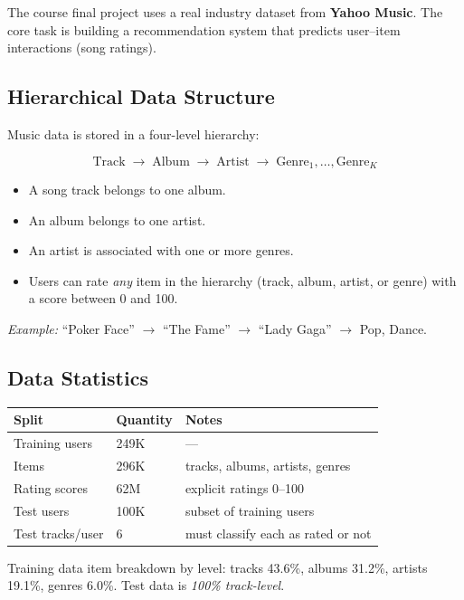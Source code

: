 \documentclass[11pt]{article}
\begin{document}
The course final project uses a real industry dataset from \textbf{Yahoo
Music}. The core task is building a recommendation system that predicts
user--item interactions (song ratings).

\subsection{Hierarchical Data Structure}
Music data is stored in a four-level hierarchy:

\[
\text{Track} \;\longrightarrow\; \text{Album} \;\longrightarrow\;
\text{Artist} \;\longrightarrow\; \text{Genre}_1, \ldots, \text{Genre}_K
\]

\begin{itemize}
    \item A song track belongs to one album.
    \item An album belongs to one artist.
    \item An artist is associated with one or more genres.
    \item Users can rate \emph{any} item in the hierarchy (track, album,
      artist, or genre) with a score between 0 and 100.
\end{itemize}

\textit{Example:} ``Poker Face'' $\to$ ``The Fame'' $\to$ ``Lady Gaga''
$\to$ Pop, Dance.

\subsection{Data Statistics}

\begin{center}
\begin{tabular}{@{}lll@{}}
\toprule
\textbf{Split} & \textbf{Quantity} & \textbf{Notes} \\
\midrule
Training users  & 249K & --- \\
Items           & 296K & tracks, albums, artists, genres \\
Rating scores   & 62M  & explicit ratings 0--100 \\
Test users      & 100K & subset of training users \\
Test tracks/user & 6   & must classify each as rated or not \\
\bottomrule
\end{tabular}
\end{center}

Training data item breakdown by level: tracks 43.6\%, albums 31.2\%,
artists 19.1\%, genres 6.0\%. Test data is \emph{100\% track-level}.
\end{document}
